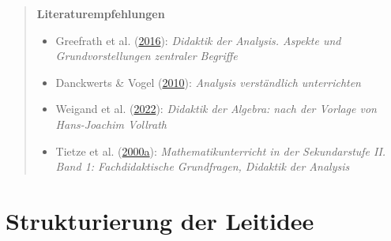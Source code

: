\documentclass[
]{scrbook}
\providecommand{\tightlist}{%
  \setlength{\itemsep}{0pt}\setlength{\parskip}{0pt}}
\theoremstyle{definition}
\theoremstyle{definition}
\theoremstyle{definition}
\theoremstyle{definition}
\theoremstyle{remark}
\begin{document}
\begin{quote}
\textbf{Literaturempfehlungen}

\begin{itemize}
\tightlist
\item
  Greefrath et al. (\protect\hyperlink{ref-Greefrath2016}{2016}): \emph{Didaktik der Analysis. Aspekte und Grundvorstellungen zentraler Begriffe}
\item
  Danckwerts \& Vogel (\protect\hyperlink{ref-Danckwerts2010}{2010}): \emph{Analysis verständlich unterrichten}
\item
  Weigand et al. (\protect\hyperlink{ref-Weigand2022}{2022}): \emph{Didaktik der Algebra: nach der Vorlage von Hans-Joachim Vollrath}
\item
  Tietze et al. (\protect\hyperlink{ref-Tietze:2000a}{2000a}): \emph{Mathematikunterricht in der Sekundarstufe II. Band 1: Fachdidaktische Grundfragen, Didaktik der Analysis}
\end{itemize}
\end{quote}

\hypertarget{strukturierung-der-leitidee-funktionaler-zusammenhang}{%
\section{Strukturierung der Leitidee}\label{strukturierung-der-leitidee-funktionaler-zusammenhang}}
\end{document}
